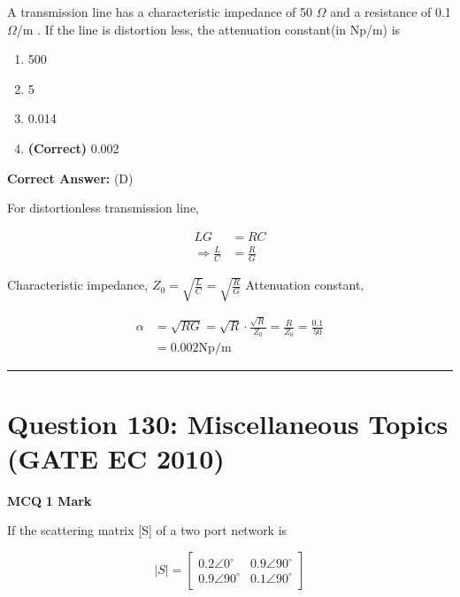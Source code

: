 \documentclass[11pt,a4paper]{article}
\begin{document}
\noindent A transmission line has a characteristic impedance of 50 $\Omega$ and a resistance of 0.1$\Omega$/m . If the line is distortion less, the attenuation constant(in Np/m) is


\begin{enumerate}[label=(\Alph*)]
    \item 500
    \item 5
    \item 0.014
    \item \textbf{(Correct)} 0.002
\end{enumerate}

\noindent \textbf{Correct Answer:} (D)

\begin{tcolorbox}[solbox, title=Detailed Solution -- Question 129]
For distortionless transmission line,

\[
\begin{aligned} L G&=R C \\ \Rightarrow \frac{L}{C}&=\frac{R}{G} \end{aligned}
\]

 Characteristic impedance,
$Z_{0}=\sqrt{\frac{L}{C}}=\sqrt{\frac{R}{G}}$
 Attenuation constant,

\[
\begin{aligned} \alpha &=\sqrt{R G}=\sqrt{R} \cdot \frac{\sqrt{R}}{Z_{0}}=\frac{R}{Z_{0}}=\frac{0.1}{50} \\ &=0.002 \mathrm{Np} / \mathrm{m} \end{aligned}
\]
\end{tcolorbox}

\vspace{1.5em}
\hrule
\vspace{1.5em}

\section*{Question 130: Miscellaneous Topics (GATE EC 2010)}
\noindent \textbf{\color{primary}MCQ} \hfill \textbf{\color{secondary}1 Mark}


\noindent If the scattering matrix [S] of a two port network is 

\[
|S|=\begin{bmatrix} 0.2\angle 0^{\circ}&0.9\angle 90^{\circ} \\ 0.9\angle 90^{\circ}& 0.1\angle 90^{\circ} \end{bmatrix}
\]
\end{document}
